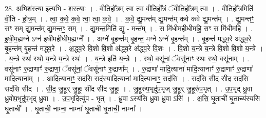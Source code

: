 \documentclass[17pt]{extarticle}
\begin{document}
28. अ॒भिश॑स्त्या॒ इत्य॒भि - श॒स्त्याः॒ । . वी॒तिहो᳚त्रम् त्वा त्वा वी॒तिहो᳚त्रं ॅवी॒तिहो᳚त्रम् त्वा । . वी॒तिहो᳚त्र॒मिति॑ वी॒ति - हो॒त्र॒म् । . त्वा॒ क॒वे॒ क॒वे॒ त्वा॒ त्वा॒ क॒वे॒ । . क॒वे॒ द्यु॒मन्त॑म् द्यु॒मन्त॑म् कवे कवे द्यु॒मन्त᳚म् । . द्यु॒मन्तꣳ॒॒ सꣳ सम् द्यु॒मन्त॑म् द्यु॒मन्तꣳ॒॒ सम् । . द्यु॒मन्त॒मिति॑ द्यु - मन्त᳚म् । . स मि॑धीमहीधीमहि॒ सꣳ स मि॑धीमहि । . इ॒धी॒म॒ह्यग्ने ऽग्न॑ इधीमहीधीम॒ह्यग्ने᳚ । . अग्ने॑ बृ॒हन्त॑म् बृ॒हन्त॒ मग्ने ऽग्ने॑ बृ॒हन्त᳚म् । . बृ॒हन्त॑ मद्ध्व॒रे अ॑द्ध्व॒रे बृ॒हन्त॑म् बृ॒हन्त॑ मद्ध्व॒रे । . अ॒द्ध्व॒रे वि॒शो वि॒शो अ॑द्ध्व॒रे अ॑द्ध्व॒रे वि॒शः । . वि॒शो य॒न्त्रे य॒न्त्रे वि॒शो वि॒शो य॒न्त्रे । . य॒न्त्रे स्थः॑ स्थो य॒न्त्रे य॒न्त्रे स्थः॑ । . य॒न्त्रे इति॑ य॒न्त्रे । . स्थो॒ वसू॑नां॒ ॅवसू॑नाꣳ स्थः स्थो॒ वसू॑नाम् । . वसू॑नाꣳ रु॒द्राणाꣳ॑ रु॒द्राणां॒ ॅवसू॑नां॒ ॅवसू॑नाꣳ रु॒द्राणा᳚म् । . रु॒द्राणा॑ मादि॒त्याना॑ मादि॒त्यानाꣳ॑ रु॒द्राणाꣳ॑ रु॒द्राणा॑ मादि॒त्याना᳚म् । . आ॒दि॒त्यानाꣳ॒॒ सद॑सि॒ सद॑स्यादि॒त्याना॑ मादि॒त्यानाꣳ॒॒ सद॑सि । . सद॑सि सीद सीद॒ सद॑सि॒ सद॑सि सीद । . सी॒द॒ जु॒हूर् जु॒हूः सी॑द सीद जु॒हूः । . जु॒हूरु॑प॒भृदु॑प॒भृज् जु॒हूर् जु॒हूरु॑प॒भृत् । . उ॒प॒भृद् ध्रु॒वा ध्रु॒वोप॒भृदु॑प॒भृद् ध्रु॒वा । . उ॒प॒भृदित्यु॑प - भृत् । . ध्रु॒वा ऽस्य॑सि ध्रु॒वा ध्रु॒वा ऽसि॑ । . अ॒सि॒ घृ॒ताची॑ घृ॒ताच्य॑स्यसि घृ॒ताची᳚ । . घृ॒ताची॒ नाम्ना॒ नाम्ना॑ घृ॒ताची॑ घृ॒ताची॒ नाम्ना᳚ । \newline
\end{document}
